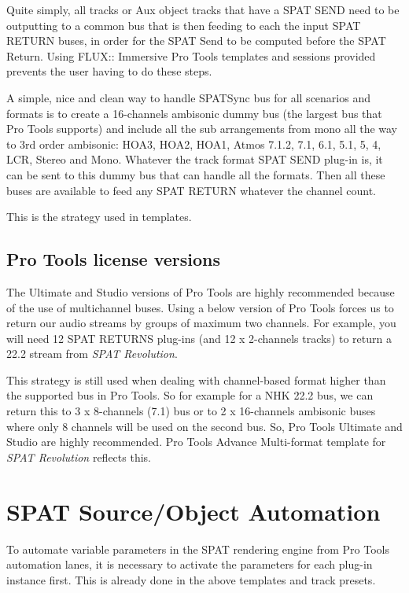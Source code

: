 \documentclass[
  letterpaper,
  DIV=11,
  numbers=noendperiod]{scrreport}
\begin{document}
Quite simply, all tracks or Aux object tracks that have a SPAT SEND need
to be outputting to a common bus that is then feeding to each the input
SPAT RETURN buses, in order for the SPAT Send to be computed before the
SPAT Return. Using FLUX:: Immersive Pro Tools templates and sessions
provided prevents the user having to do these steps.

A simple, nice and clean way to handle SPATSync bus for all scenarios
and formats is to create a 16-channels ambisonic dummy bus (the largest
bus that Pro Tools supports) and include all the sub arrangements from
mono all the way to 3rd order ambisonic: HOA3, HOA2, HOA1, Atmos 7.1.2,
7.1, 6.1, 5.1, 5, 4, LCR, Stereo and Mono. Whatever the track format
SPAT SEND plug-in is, it can be sent to this dummy bus that can handle
all the formats. Then all these buses are available to feed any SPAT
RETURN whatever the channel count.

This is the strategy used in templates.

\hypertarget{pro-tools-license-versions}{%
\subsection{Pro Tools license
versions}\label{pro-tools-license-versions}}

The Ultimate and Studio versions of Pro Tools are highly recommended
because of the use of multichannel buses. Using a below version of Pro
Tools forces us to return our audio streams by groups of maximum two
channels. For example, you will need 12 SPAT RETURNS plug-ins (and 12 x
2-channels tracks) to return a 22.2 stream from \emph{SPAT Revolution}.

This strategy is still used when dealing with channel-based format
higher than the supported bus in Pro Tools. So for example for a NHK
22.2 bus, we can return this to 3 x 8-channels (7.1) bus or to 2 x
16-channels ambisonic buses where only 8 channels will be used on the
second bus. So, Pro Tools Ultimate and Studio are highly recommended.
Pro Tools Advance Multi-format template for \emph{SPAT Revolution}
reflects this.

\hypertarget{spat-sourceobject-automation}{%
\section{SPAT Source/Object
Automation}\label{spat-sourceobject-automation}}

To automate variable parameters in the SPAT rendering engine from Pro
Tools automation lanes, it is necessary to activate the parameters for
each plug-in instance first. This is already done in the above templates
and track presets.
\end{document}
